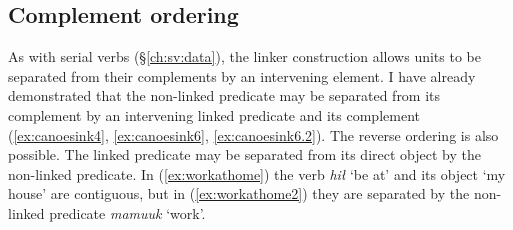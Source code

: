 \begin{comment}
ACTUALLY*2: This works quite well for showing a deictic predicate. Unfortunately it is XL so I cannot use it. Oh well!

ACTUALLY! I think the below is wrong. If you look at XL's sentence, the predicate is deictic ʔaḥʔaa, to which the linker still attaches! This would mean the only counterexample would be Adv V+link. Investigate this further.

But occasionally the linker may occur on the sole predicate in a sentence. This appears to contradict examples (\ref{ex:someonespoke}) and (\ref{ex:*someonespoke}), but the translation provided for these ``dangling" linkers always indicates they are notionally attached to the preceding sentence. I have 1 (TODO: look for more, update number) example from my corpus, involving the word \textit{qʷis} `do so'.\footnote{I am not here counting examples from \textit{tupaat} Julia Lucas, who is unique in always uses the the conjunction \textit{ʔunʔuuƛ} with a linker attached. I believe she has a different lexical entry for the word, and will explain in section (TODO).} I give one example below:

TODO, this is from Charlie Lucas, who I do not have permissions to share. Update it with a sharable example.

Context: \textit{łačiƛni wa. ʔuušciłʔap̓aƛukni nunuuk. ʔuušciłʔap̓aƛukni huyaał.} `We've let it go, haven't we? It has become hard for us to sing. It has become hard for us to dance.'

\ex \label{ex:danglinglinker}
\begingl
\glpreamble ʔaḥʔaa qʷisḥnii.//
\gla ʔaḥʔaa qʷis-(q)ḥ=niˑ //
\glb DDYN do.so-\textsc{link}=\textsc{neut.1pl} //
\glft `That's what happened to us.' //
\endgl
\xe

Although the one predicate is 

\end{comment}


\subsection{Complement ordering} \label{ch:link:participants}

As with serial verbs (\S\ref{ch:sv:data}), the linker construction allows units to be separated from their complements by an intervening element. I have already demonstrated that the non-linked predicate may be separated from its complement by an intervening linked predicate and its complement (\ref{ex:canoesink4}, \ref{ex:canoesink6}, \ref{ex:canoesink6.2}). The reverse ordering is also possible. The linked predicate may be separated from its direct object by the non-linked predicate. In (\ref{ex:workathome}) the verb \textit{hił} `be at' and its object `my house' are contiguous, but in (\ref{ex:workathome2}) they are separated by the non-linked predicate \textit{mamuuk} `work'.

